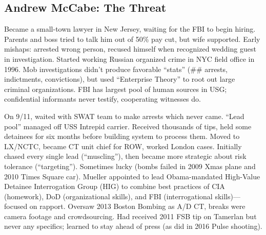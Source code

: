 \documentclass[
]{article}
\begin{document}
\hypertarget{andrew-mccabe-the-threat}{%
\subsection{Andrew McCabe: The Threat}\label{andrew-mccabe-the-threat}}

Became a small-town lawyer in New Jersey, waiting for the FBI to begin
hiring. Parents and boss tried to talk him out of 50\% pay cut, but wife
supported. Early mishaps: arrested wrong person, recused himself when
recognized wedding guest in investigation. Started working Russian
organized crime in NYC field office in 1996. Mob investigations didn't
produce favorable ``stats'' (\#\# arrests, indictments, convictions),
but used ``Enterprise Theory'' to root out large criminal organizations.
FBI has largest pool of human sources in USG; confidential informants
never testify, cooperating witnesses do.

On 9/11, waited with SWAT team to make arrests which never came. ``Lead
pool'' managed off USS Intrepid carrier. Received thousands of tips,
held some detainees for six months before building system to process
them. Moved to LX/NCTC, became CT unit chief for ROW, worked London
cases. Initially chased every single lead (``muscling''), then became
more strategic about risk tolerance (``targeting''). Sometimes lucky
(bombs failed in 2009 Xmas plane and 2010 Times Square car). Mueller
appointed to lead Obama-mandated High-Value Detainee Interrogation Group
(HIG) to combine best practices of CIA (homework), DoD (organizational
skills), and FBI (interrogational skills)---focused on rapport. Oversaw
2013 Boston Bombing as A/D CT, breaks were camera footage and
crowdsourcing. Had received 2011 FSB tip on Tamerlan but never any
specifics; learned to stay ahead of press (as did in 2016 Pulse
shooting).
\end{document}
